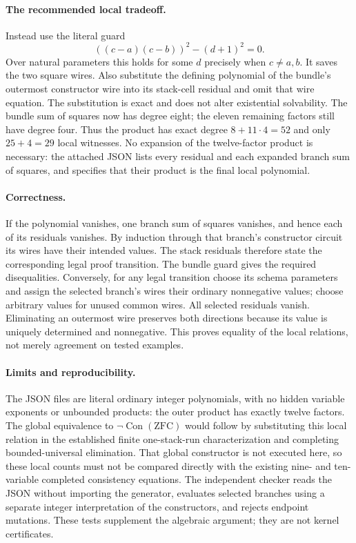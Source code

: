 \paragraph{The recommended local tradeoff.}
Instead use the literal guard
\[
 ((c-a)(c-b))^2-(d+1)^2=0.
\]
Over natural parameters this holds for some $d$ precisely when $c\ne a,b$.
It saves the two square wires. Also substitute the defining polynomial of
the bundle's outermost constructor wire into its stack-cell residual and
omit that wire equation. The substitution is exact and does not alter
existential solvability. The bundle sum of squares now has degree eight;
the eleven remaining factors still have degree four. Thus the product has
exact degree $8+11\cdot4=52$ and only $25+4=29$ local witnesses.
No expansion of the twelve-factor product is necessary: the attached
JSON lists every residual and each expanded branch sum of squares, and
specifies that their product is the final local polynomial.

\paragraph{Correctness.}
If the polynomial vanishes, one branch sum of squares vanishes, and hence
each of its residuals vanishes. By induction through that branch's
constructor circuit its wires have their intended values. The stack
residuals therefore state the corresponding legal proof transition. The
bundle guard gives the required disequalities. Conversely, for any legal
transition choose its schema parameters and assign the selected branch's
wires their ordinary nonnegative values; choose arbitrary values for
unused common wires. All selected residuals vanish. Eliminating an
outermost wire preserves both directions because its value is uniquely
determined and nonnegative. This proves equality of the local relations,
not merely agreement on tested examples.

\paragraph{Limits and reproducibility.}
The JSON files are literal ordinary integer polynomials, with no hidden
variable exponents or unbounded products: the outer product has exactly
twelve factors. The global equivalence to $\neg\operatorname{Con}(\mathrm{ZFC})$
would follow by substituting this local relation in the established finite
one-stack-run characterization and completing bounded-universal
elimination. That global constructor is not executed here, so these local
counts must not be compared directly with the existing nine- and
ten-variable completed consistency equations. The independent checker
reads the JSON without importing the generator, evaluates selected
branches using a separate integer interpretation of the constructors,
and rejects endpoint mutations. These tests supplement the algebraic
argument; they are not kernel certificates.

